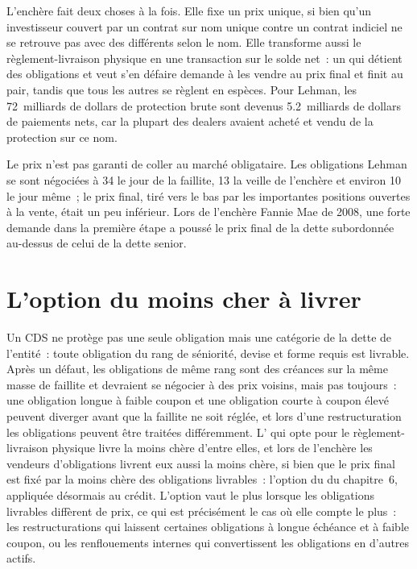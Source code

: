 L'enchère fait deux choses à la fois. Elle fixe un prix unique, si bien qu'un investisseur couvert
par un contrat sur nom unique contre un contrat indiciel ne se retrouve pas avec des  différents selon le nom. Elle transforme aussi le règlement-livraison physique en une transaction sur le solde net~: un
 qui détient des obligations et veut s'en défaire demande à les vendre au
prix final et finit au pair, tandis que tous les autres se règlent en espèces. Pour Lehman, les
72~milliards de dollars de protection brute sont devenus 5.2~milliards de dollars de paiements nets, car la plupart
des dealers avaient acheté et vendu de la protection sur ce nom.

Le prix n'est pas garanti de coller au marché obligataire. Les obligations Lehman se sont négociées à 34 le
jour de la faillite, 13 la veille de l'enchère et environ 10 le jour même~; le
prix final, tiré vers le bas par les importantes positions ouvertes à la vente, était un peu inférieur. Lors de l'enchère Fannie Mae de 2008, une forte demande dans la
première étape a poussé le prix final de la dette subordonnée au-dessus de celui de la dette senior.

\section{L'option du moins cher à livrer}

Un CDS ne protège pas une seule obligation mais une catégorie de la dette de l'entité~: toute obligation du
rang de séniorité, devise et forme requis est livrable. Après un défaut, les obligations de même
rang sont des créances sur la même masse de faillite et devraient se négocier à des prix voisins, mais
pas toujours~: une obligation longue à faible coupon et une obligation courte à coupon élevé peuvent
diverger avant que la faillite ne soit réglée, et lors d'une restructuration les obligations peuvent être
traitées différemment. L' qui opte pour le règlement-livraison physique livre la moins chère
d'entre elles, et lors de l'enchère les vendeurs d'obligations livrent eux aussi la moins chère, si bien que le
prix final est fixé par la moins chère des obligations livrables~: l'option du  du
chapitre~6, appliquée désormais au crédit. L'option vaut le plus lorsque les obligations livrables diffèrent de prix,
ce qui est précisément le cas où elle compte le plus~: les restructurations qui laissent certaines obligations à longue échéance et
à faible coupon, ou les renflouements internes qui convertissent les obligations en d'autres actifs.


